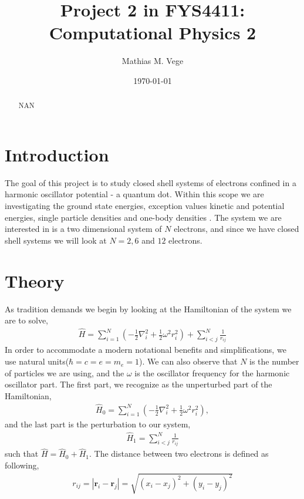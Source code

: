 \documentclass[11pt]{article}
\title{Project 2 in FYS4411: Computational Physics 2}
\author{Mathias M. Vege}
\date{\today}
\newcommand{\husk}[1]{\color{red} #1 \color{black}}
\begin{document}
\maketitle

\begin{abstract}
NAN
\end{abstract}

\tableofcontents

\section{Introduction}
The goal of this project is to study closed shell systems of electrons confined in a harmonic oscillator potential - a quantum dot. Within this scope we are investigating the ground state energies, \husk{exception values kinetic and potential energies, single particle densities and one-body densities}. The system we are interested in is a two dimensional system of $N$ electrons, and since we have closed shell systems we will look at $N=2,6$ and $12$ electrons.



\section{Theory}
As tradition demands we begin by looking at the Hamiltonian of the system we are to solve,
\begin{align}
	\hat{H} = \sum^N_{i=1} \left( -\frac{1}{2}\nabla^2_i + \frac{1}{2}\omega^2r^2_i \right) + \sum^N_{i<j} \frac{1}{r_{ij}}
	\label{eq:hamiltonian}
\end{align}
In order to accommodate a modern notational benefits and simplifications, we use natural units($\hbar = c = e = m_e = 1$). We can also observe that $N$ is the number of particles we are using, and the $\omega$ is the oscillator frequency for the harmonic oscillator part. The first part, we recognize as the unperturbed part of the Hamiltonian,
\begin{align}
	\hat{H}_0 = \sum^N_{i=1} \left( -\frac{1}{2}\nabla^2_i + \frac{1}{2}\omega^2r^2_i \right),
	\label{eq:hamiltonian_unperturbed}
\end{align}
and the last part is the perturbation to our system,
\begin{align}
	\hat{H}_1 = \sum^N_{i<j} \frac{1}{r_{ij}}
	\label{eq:hamiltonian_perturbed}
\end{align}
such that $\hat{H} = \hat{H}_0 + \hat{H}_1$. The distance between two electrons is defined as following,
\begin{align}
	r_{ij} = |\mathbf{r}_i - \mathbf{r}_j| = \sqrt{(x_i - x_j)^2 + (y_i - y_j)^2}
	\label{eq:electron_distance}
\end{align}
\end{document}
